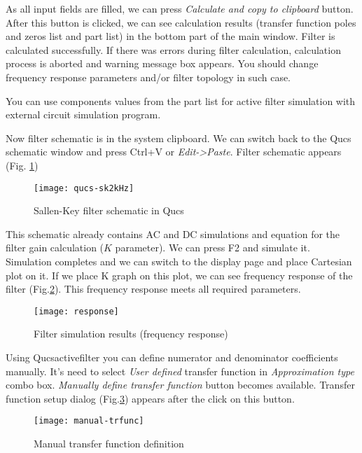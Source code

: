As all input fields are filled, we can press \emph{Calculate and copy to
clipboard} button. After this button is clicked, we can see calculation
results (transfer function poles and zeros list and part list) in the bottom
part of the main window. Filter is calculated successfully. If there was errors
during filter calculation, calculation process is aborted and warning message
box appears. You should change frequency response parameters and/or filter
topology in such case.

You can use components values from the part list for active filter simulation
with external circuit simulation program.


Now filter
schematic is in the system clipboard. We can switch back to the Qucs schematic
window and press Ctrl+V or \emph{Edit->Paste}. Filter schematic appears (Fig.
\ref{fig:sk2kHz-qucs})

\begin{figure}[!ht]
  \centering
  \texttt{[image: qucs-sk2kHz]}
  \caption{Sallen-Key filter schematic in Qucs}
  \label{fig:sk2kHz-qucs}
\end{figure}
\FloatBarrier

This schematic already contains AC and DC simulations and equation for the
filter gain calculation ($K$ parameter). We can press F2 and simulate it.
Simulation completes and we can switch to the display page and place Cartesian
plot on it. If we place K graph on this plot, we can see frequency response of
the filter (Fig.\ref{fig:resp}). This frequency response meets all required
parameters.

\begin{figure}[!ht]
  \centering
  \texttt{[image: response]}
  \caption{Filter simulation results (frequency response)}
  \label{fig:resp}
\end{figure}
\FloatBarrier


Using Qucsactivefilter you can define numerator and denominator coefficients
manually. It's need to select \emph{User defined} transfer function in
\emph{Approximation type} combo box. \emph{Manually define transfer function}
button becomes available. Transfer function setup dialog
(Fig.\ref{fig:mantrfunc})
appears after the click on this button.

\begin{figure}[ht]
  \centering
  \texttt{[image: manual-trfunc]}
  \caption{Manual transfer function definition}
  \label{fig:mantrfunc}
\end{figure}
\FloatBarrier

